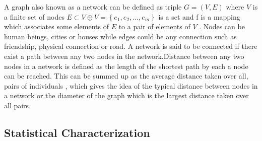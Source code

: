  A graph also known as a network   can be  defined as triple $G = (V,E)$ where $V$ is a finite set of nodes $E \subset V \oplus V = \left\lbrace e_1,e_2,\dots ,e_m \right\rbrace$ is a set and f is a mapping which associates some elements of $E$ to a pair of elements of $V$ \citep{estrada2012structure}. Nodes can be human beings, cities or houses while edges could be any connection such as friendship, physical connection or road.
A network is said to be connected if there exist a path between any two nodes in the network.Distance between any two nodes in a network is defined as the length of the shortest path by each a node can be reached. This can be summed up as the average distance taken over all, pairs of individuals , which gives the idea of the typical distance between nodes in a network or the diameter of the graph which is the largest distance taken over all pairs.
\subsection{Statistical Characterization}
 
